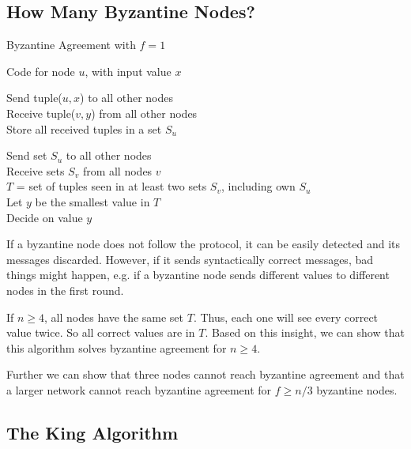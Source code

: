 \subsection{How Many Byzantine Nodes?}

\begin{algorithm}[H]
\caption{Byzantine Agreement with $f = 1$ }
	Code for node $u$, with input value $x$ \\
	
	\BlankLine
	\BlankLine
	
	Send tuple($u,x$) to all other nodes \\
	Receive tuple($v, y$) from all other nodes \\
	Store all received tuples in a set $S_u$
	
	\BlankLine
	\BlankLine
	
	Send set $S_u$ to all other nodes \\
	Receive sets $S_v$ from all nodes $v$ \\
	$T$ = set of tuples seen in at least two sets $S_v$, including own $S_u$ \\
	Let $y$ be the smallest value in $T$ \\
	Decide on value $y$
\end{algorithm}
\medskip

If a byzantine node does not follow the protocol, it can be easily detected and its messages discarded. However, if it sends syntactically correct messages, bad things might happen, e.g. if a byzantine node sends different values to different nodes in the first round. \medskip

If $n \geq 4$, all nodes have the same set $T$. Thus, each one will see every correct value twice. So all correct values are in $T$. Based on this insight, we can show that this algorithm solves byzantine agreement for $n \geq 4$. \medskip

Further we can show that three nodes cannot reach byzantine agreement and that a larger network cannot reach byzantine agreement for $f \geq n / 3$ byzantine nodes.


\subsection{The King Algorithm}

